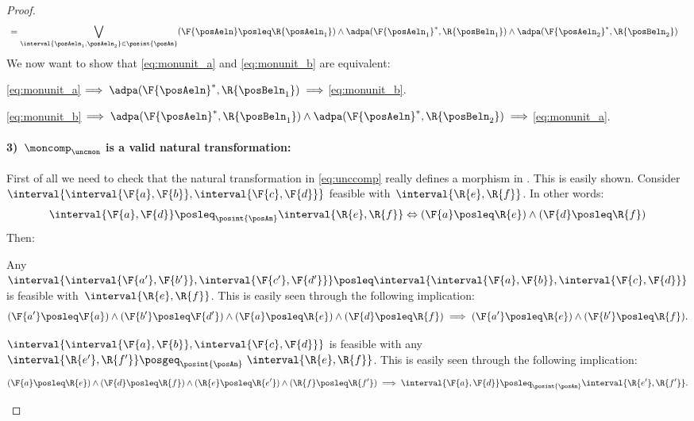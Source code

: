 \begin{proof}
\begin{equation}
\begin{aligned}
        &=\bigvee_{\interval{\posAeln_1,\posAeln_2}\in \posint{\posAn}} (\F{\posAeln}\posleq \R{\posAeln_1})\wedge \adpa(\F{\posAeln_1}^*,\R{\posBeln_1})\wedge \adpa(\F{\posAeln_2}^*,\R{\posBeln_2})
      \end{aligned}
  \end{equation}
  We now want to show that \cref{eq:monunit_a} and \cref{eq:monunit_b} are equivalent:
  \begin{compactitem}
  \item \cref{eq:monunit_a}$\implies \adpa(\F{\posAeln}^*,\R{\posBeln_1}) \implies$\cref{eq:monunit_b}.
  \item \cref{eq:monunit_b}$\implies\adpa(\F{\posAeln}^*,\R{\posBeln_1})\wedge \adpa(\F{\posAeln}^*,\R{\posBeln_2})\implies$\cref{eq:monunit_a}.
  \end{compactitem}
  \paragraph*{3)~$\moncomp_\uncmon$ is a valid natural transformation:}
  First of all we need to check that the natural transformation in \cref{eq:unccomp} really defines a morphism in \DP.
  This is easily shown. Consider~$\interval{\interval{\F{a},\F{b}},\interval{\F{c},\F{d}}}$ feasible with~$\interval{\R{e},\R{f}}$.
  In other words:
  \begin{equation}
  \interval{\F{a},\F{d}}\posleq_{\posint{\posAn}}\interval{\R{e},\R{f}}\Leftrightarrow (\F{a}\posleq \R{e}) \wedge (\F{d}\posleq \R{f})
  \end{equation}
  Then:
  \begin{compactitem}
  \item Any~$\interval{\interval{\F{a'},\F{b'}},\interval{\F{c'},\F{d'}}}\posleq \interval{\interval{\F{a},\F{b}},\interval{\F{c},\F{d}}}$ is feasible with~$\interval{\R{e},\R{f}}$.
  This is easily seen through the following implication:
  \begin{equation}
  (\F{a'}\posleq \F{a})\wedge (\F{b'}\posleq \F{d'}) \wedge (\F{a}\posleq \R{e}) \wedge (\F{d}\posleq \R{f})\implies (\F{a'}\posleq \R{e}) \wedge (\F{b'}\posleq \R{f}).
  \end{equation}
  \item $\interval{\interval{\F{a},\F{b}},\interval{\F{c},\F{d}}}$ is feasible with any~$\interval{\R{e'},\R{f'}}\posgeq_{\posint{\posAn}} ~\interval{\R{e},\R{f}}$.
  This is easily seen through the following implication:
  \begin{equation}
  (\F{a}\posleq \R{e}) \wedge (\F{d}\posleq \R{f}) \wedge (\R{e}\posleq \R{e'})\wedge (\R{f}\posleq \R{f'})\implies \interval{\F{a},\F{d}}\posleq_{\posint{\posAn}}\interval{\R{e'},\R{f'}}.

\end{equation}
\end{compactitem}
\end{proof}
